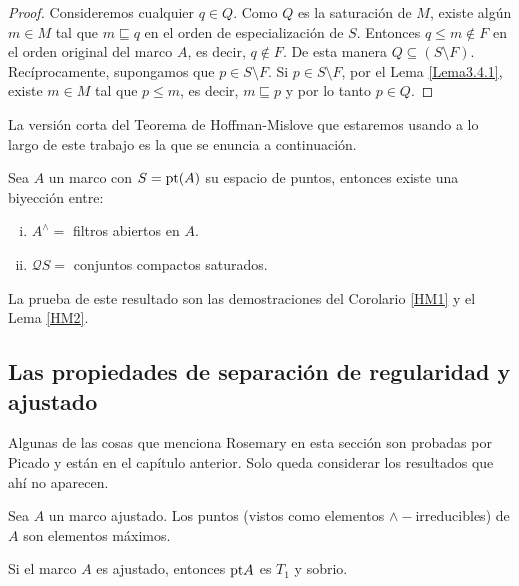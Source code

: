 \begin{proof}
    Consideremos cualquier $q\in Q$. Como $Q$ es la saturación de $M$, existe algún $m\in M$ tal que $m\sqsubseteq q$ en el orden de especialización de $S$. Entonces $q\leq m\notin F$ en el orden original del marco $A$, es decir, $q\notin F$. De esta manera $Q\subseteq (S\setminus F)$.\\

    Recíprocamente, supongamos que $p\in S\setminus F$. Si $p\in S\setminus F$, por el Lema \ref{Lema3.4.1}, existe $m\in M$ tal que $p\leq m$, es decir, $m\sqsubseteq p$ y por lo tanto $p\in Q$.
\end{proof}

La versión corta del Teorema de Hoffman-Mislove que estaremos usando a lo largo de este trabajo es la que se enuncia a continuación.

\begin{thm}\label{TeoremaHM}

Sea $A$ un marco con $S=\mathrm{pt}(A)$ su espacio de puntos, entonces existe una biyección entre:

\begin{enumerate}[i)]

\item $A^{\wedge}=$ filtros abiertos en $A$.

\item $\mathcal{Q}S=$ conjuntos compactos saturados.

\end{enumerate}
\end{thm}

La prueba de este resultado son las demostraciones del Corolario \ref{HM1} y el Lema \ref{HM2}.

\subsection{Las propiedades de separación de regularidad y ajustado}

Algunas de las cosas que menciona Rosemary en esta sección son probadas por Picado y están en el capítulo anterior. Solo queda considerar los resultados que ahí no aparecen.

\begin{lem}
    Sea $A$ un marco ajustado. Los puntos (vistos como elementos $\wedge-$irreducibles) de $A$ son elementos máximos.
\end{lem}

\begin{lem}
    Si el marco $A$ es ajustado, entonces $\mathrm{pt} A$ es $T_1$ y sobrio.
\end{lem}

